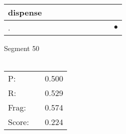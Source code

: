 \documentclass[landscape]{article}
\newcommand{\ssp}{\hspace{2pt}}
\newcommand{\mex}{\cellcolor{g}$\bullet$}
\begin{document}
\begin{tabular}{|l|p{10pt}|p{10pt}|p{10pt}|p{10pt}|p{10pt}|p{10pt}|p{10pt}|p{10pt}|p{10pt}|}
\hline
\ssp dispense \ssp&\hspace{2pt}&\hspace{2pt}&\hspace{2pt}&\hspace{2pt}&\hspace{2pt}&\hspace{2pt}&\hspace{2pt}&\hspace{2pt}&\hspace{2pt}\\
\hline
\ssp \cellcolor{ref8}. \ssp&\hspace{2pt}&\hspace{2pt}&\hspace{2pt}&\hspace{2pt}&\hspace{2pt}&\hspace{2pt}&\hspace{2pt}&\hspace{2pt}&\hspace{2pt}\mex\\
\hline
\end{tabular}

\vspace{6pt}
\noindent Segment 50\\\\
\noindent\begin{tabular}{lm{12pt}r}
\hline
P:&&0.500\\
R:&&0.529\\
Frag:&&0.574\\
Score:&&0.224\\
\end{tabular}

\newpage
\end{document}
